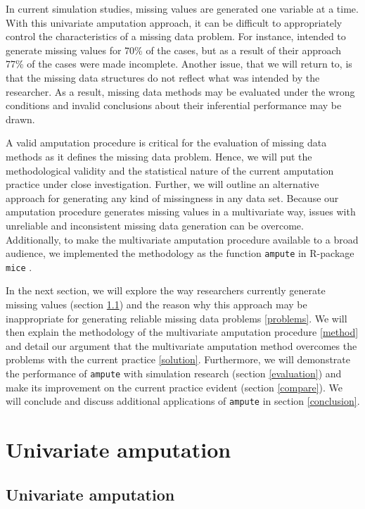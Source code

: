 \documentclass[11pt,a4paper]{article}
\newcommand{\code}[1]{\texttt{#1}}
\begin{document}
In current simulation studies, missing values are generated one variable at a time. With this univariate amputation approach, it can be difficult to appropriately control the characteristics of a missing data problem. For instance, \citet[][p. 11]{Seaman2012} intended to generate missing values for 70\% of the cases, but as a result of their approach 77\% of the cases were made incomplete. Another issue, that we will return to, is that the missing data structures do not reflect what was intended by the researcher. As a result, missing data methods may be evaluated under the wrong conditions and invalid conclusions about their inferential performance may be drawn. 

A valid amputation procedure is critical for the evaluation of missing data methods as it defines the missing data problem. Hence, we will put the methodological validity and the statistical nature of the current amputation practice under close investigation. Further, we will outline an alternative approach for generating any kind of missingness in any data set. Because our amputation procedure generates missing values in a multivariate way, issues with unreliable and inconsistent missing data generation can be overcome. Additionally, to make the multivariate amputation procedure available to a broad audience, we implemented the methodology as the function \code{ampute} \citep{AmputeVignette} in R-package \code{mice} \citep{Stef2011}. 

In the next section, we will explore the way researchers currently generate missing values (section \ref{current}) and the reason why this approach may be inappropriate for generating reliable missing data problems \eqref{problems}. We will then explain the methodology of the multivariate amputation procedure \eqref{method} and detail our argument that the multivariate amputation method overcomes the problems with the current practice \eqref{solution}. Furthermore, we will demonstrate the performance of \code{ampute} with simulation research (section \ref{evaluation}) and make its improvement on the current practice evident (section \ref{compare}). We will conclude and discuss additional applications of \code{ampute} in section \ref{conclusion}. 

\section{Univariate amputation}

\subsection{\normalsize Univariate amputation}\label{current}
\end{document}
